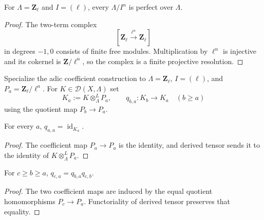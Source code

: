 \begin{lemma}
\label{lemma:weil-pbc-zl-reduction-perfect}
\uses{}
For $\Lambda=\mathbf Z_\ell$ and $I=(\ell)$, every
$\Lambda/I^n$ is perfect over $\Lambda$.
\end{lemma}
\begin{proof}
\uses{} 
The two-term complex
\[
 [\mathbf Z_\ell\xrightarrow{\ell^n}\mathbf Z_\ell]
\]
in degrees $-1,0$ consists of finite free modules.  Multiplication by
$\ell^n$ is injective and its cokernel is $\mathbf Z/\ell^n$, so the complex
is a finite projective resolution.
\end{proof}


\begin{definition}
\label{def:weil-efi-coeff-zl-reduction-tower}
Specialize the adic coefficient construction to
$\Lambda=\mathbf Z_\ell$, $I=(\ell)$, and
$P_a=\mathbf Z_\ell/\ell^a$.  For $K\in\mathcal D(X,\Lambda)$ set
\[
 K_a:=K\otimes^L_\Lambda P_a,
 \qquad q_{b,a}:K_b\longrightarrow K_a\quad(b\geq a)
\]
using the quotient map $P_b\to P_a$.
\end{definition}

\begin{lemma}
\label{lemma:weil-efi-coeff-zl-reduction-identity}
For every $a$, $q_{a,a}=\operatorname{id}_{K_a}$.
\end{lemma}
\begin{proof}
The coefficient map $P_a\to P_a$ is the identity, and derived tensor sends
it to the identity of $K\otimes^L_\Lambda P_a$.
\end{proof}

\begin{lemma}
\label{lemma:weil-efi-coeff-zl-reduction-composition}
For $c\geq b\geq a$, $q_{c,a}=q_{b,a}q_{c,b}$.
\end{lemma}
\begin{proof}
The two coefficient maps are induced by the equal quotient homomorphisms
$P_c\to P_a$.  Functoriality of derived tensor preserves that equality.
\end{proof}

